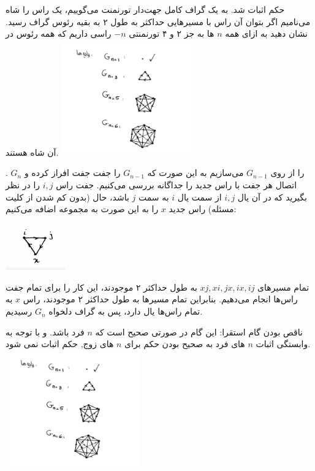 \documentclass[11pt,largemargins]{h2wp}
\begin{document}
  حکم اثبات شد.
 \question
به یک گراف کامل جهت‌دار تورنمنت می‌گوییم، یک راس را شاه می‌نامیم اگر بتوان آن راس با مسیر‌هایی حداکثر به طول ۲ به بقیه رئوس گراف رسید. نشان دهید به ازای همه 
    $n$ ها به جز ۲ و ۴ تورنمنتی 
    $-n$ راسی داریم که همه رئوس در آن شاه هستند.    
\solution
   {\hspace*{5cm}\includegraphics[height=5cm]{Graph1.jpg}}    
   
 
   . $G_{n}$ را از روی 
    $G_{n-1}$ می‌سازیم به این صورت که  $G_{n-1}$ را جفت جفت افراز کرده و اتصال هر جفت با راس جدید را جداگانه بررسی می‌کنیم. جفت راس $i, j$ را در نظر بگیرید که در آن یال $i, j$ از سمت یال $i$ به سمت 
    $j$
     باشد، حال 
     (بدون کم شدن از کلیت مسئله)
      راس جدید
     $x$
      را به این صورت به مجموعه اضافه می‌کنیم:
    
       {\hspace*{6cm}\includegraphics[height=2cm]{Graph2.jpg}}    
       
    تمام مسیر‌های
    $xj, xi, jx, ix, ij$ به طول حداکثر ۲ موجودند، این کار را برای تمام جفت راس‌ها انجام می‌دهیم. بنابراین تمام مسیر‌ها به طول حداکثر ۲ موجودند، راس $x$ به تمام راس‌ها یال دارد، پس به گراف دلخواه $G_{n}$ رسیدیم.
    
\notes
{}
ناقص بودن گام استقرا:
این گام در صورتی صحیح است که $n$ فرد باشد.
و با توجه به وابستگی اثبات $n$ های فرد به صحیح بودن حکم برای $n$ های زوج, حکم اثبات نمی شود.
   {\hspace*{5cm}\includegraphics[height=5cm]{Graph1.jpg}}    
   
\end{document}

